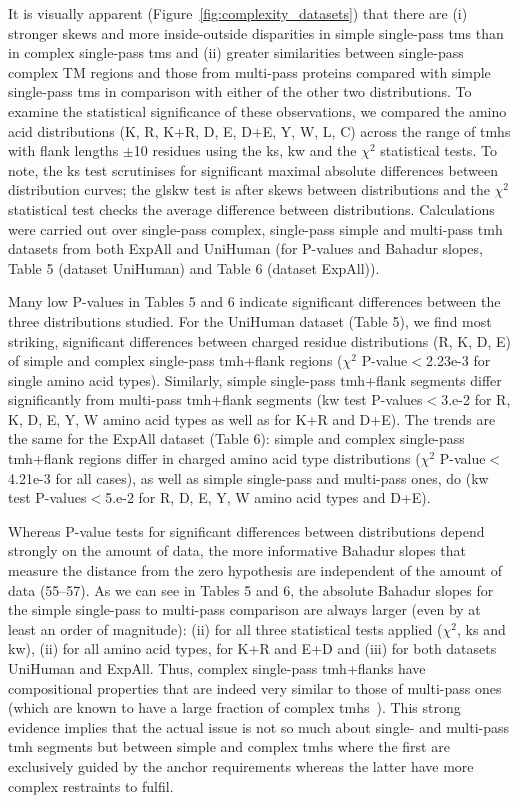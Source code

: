 It is visually apparent (Figure~\ref{fig:complexity_datasets}) that there are (i) stronger skews and more inside-outside disparities in simple single-pass \gls{tm}s than in complex single-pass \gls{tm}s and (ii) greater similarities between single-pass complex TM regions and those from multi-pass proteins compared with simple single-pass \gls{tm}s in comparison with either of the other two distributions.
To examine the statistical significance of these observations, we compared the amino acid distributions (K, R, K+R, D, E, D+E, Y, W, L, C) across the range of \gls{tmh}s with flank lengths $\pm$10 residues using the \gls{ks}, \gls{kw} and the \({\chi}^{2}\) statistical tests.
To note, the \gls{ks} test scrutinises for significant maximal absolute differences between distribution curves; the gls{kw} test is after skews between distributions and the \({\chi}^{2}\) statistical test checks the average difference between distributions.
Calculations were carried out over single-pass complex, single-pass simple and multi-pass \gls{tmh} datasets from both ExpAll and UniHuman (for P-values and Bahadur slopes, Table 5 (dataset UniHuman) and Table 6 (dataset ExpAll)).

Many low P-values in Tables 5 and 6 indicate significant differences between the three distributions studied.
For the UniHuman dataset (Table 5), we find most striking, significant differences between charged residue distributions (R, K, D, E) of simple and complex single-pass \gls{tmh}+flank regions (\({\chi}^{2}\) P-value$<$2.23e-3 for single amino acid types).
Similarly, simple single-pass \gls{tmh}+flank segments differ significantly from multi-pass \gls{tmh}+flank segments (\gls{kw} test P-values$<$3.e-2 for R, K, D, E, Y, W amino acid types as well as for K+R and D+E).
The trends are the same for the ExpAll dataset (Table 6): simple and complex single-pass \gls{tmh}+flank regions differ in charged amino acid type distributions (\({\chi}^{2}\) P-value$<$4.21e-3 for all cases), as well as simple single-pass and multi-pass ones, do (\gls{kw} test P-values$<$5.e-2 for R, D, E, Y, W amino acid types and D+E).

Whereas P-value tests for significant differences between distributions depend strongly on the amount of data, the more informative Bahadur slopes that measure the distance from the zero hypothesis are independent of the amount of data (55--57).
As we can see in Tables 5 and 6, the absolute Bahadur slopes for the simple single-pass to multi-pass comparison are always larger (even by at least an order of magnitude): (ii) for all three statistical tests applied (\({\chi}^{2}\), \gls{ks} and \gls{kw}), (ii) for all amino acid types, for K+R and E+D and (iii) for both datasets UniHuman and ExpAll.
Thus, complex single-pass \gls{tmh}+flanks have compositional properties that are indeed very similar to those of multi-pass ones (which are known to have a large fraction of complex \gls{tmh}s~\cite{Wong2011, Wong2012}).
This strong evidence implies that the actual issue is not so much about single- and multi-pass \gls{tmh} segments but between simple and complex \gls{tmh}s where the first are exclusively guided by the anchor requirements whereas the latter have more complex restraints to fulfil.


